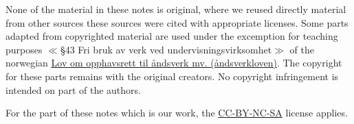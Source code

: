 \documentclass[11pt,parskip=half,x11names, twoside=false, open=any, a4paper]{scrbook}
\begin{document}
None of the material in these notes is original, where we reused directly material from other sources these sources were cited with appropriate licenses. Some parts adapted from copyrighted material are used under the excemption for teaching purposes $\ll$\S 43 Fri bruk av verk ved undervisningsvirksomhet$\gg$ of the norwegian \href{https://lovdata.no/dokument/NL/lov/2018-06-15-40}{Lov om opphavsrett til åndsverk mv. (åndsverkloven)}. The copyright for these parts remains with the original creators. No copyright infringement is intended on part of the authors.

For the part of these notes which is our work, the \href{https://creativecommons.org/licenses/by-nc-sa/4.0/}{CC-BY-NC-SA} license applies.
\pagestyle{empty}
\newpage
\tableofcontents

\pagestyle{headings}

\setcounter{page}{1}


%

%
%

\appendix
%



\end{document}
